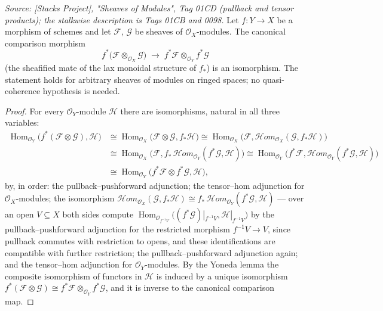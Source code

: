 \begin{lemma}\leanok
  \label{lem:pullback_tensor_map_isiso}
  \textit{Source: [Stacks Project], "Sheaves of Modules", Tag 01CD (pullback
  and tensor products); the stalkwise description is Tags 01CB and 0098.}
  Let \(f : Y \to X\) be a morphism of schemes and let \(\mathcal{F}\),
  \(\mathcal{G}\) be sheaves of \(\mathcal{O}_X\)-modules.  The canonical
  comparison morphism
  \[
    f^*\bigl(\mathcal{F} \otimes_{\mathcal{O}_X} \mathcal{G}\bigr)
    \;\longrightarrow\;
    f^*\mathcal{F} \otimes_{\mathcal{O}_Y} f^*\mathcal{G}
  \]
  (the sheafified mate of the lax monoidal structure of \(f_*\)) is an
  isomorphism.  The statement holds for arbitrary sheaves of modules on
  ringed spaces; no quasi-coherence hypothesis is needed.
\end{lemma}
\begin{proof}
  For every \(\mathcal{O}_Y\)-module \(\mathcal{H}\) there are isomorphisms,
  natural in all three variables:
  \begin{align*}
    \operatorname{Hom}_{\mathcal{O}_Y}\!\bigl(f^*(\mathcal{F} \otimes
      \mathcal{G}), \mathcal{H}\bigr)
    &\cong \operatorname{Hom}_{\mathcal{O}_X}\!\bigl(\mathcal{F} \otimes
      \mathcal{G}, f_*\mathcal{H}\bigr)
    \cong \operatorname{Hom}_{\mathcal{O}_X}\!\bigl(\mathcal{F},
      \mathcal{H}om_{\mathcal{O}_X}(\mathcal{G}, f_*\mathcal{H})\bigr) \\
    &\cong \operatorname{Hom}_{\mathcal{O}_X}\!\bigl(\mathcal{F},
      f_*\,\mathcal{H}om_{\mathcal{O}_Y}(f^*\mathcal{G}, \mathcal{H})\bigr)
    \cong \operatorname{Hom}_{\mathcal{O}_Y}\!\bigl(f^*\mathcal{F},
      \mathcal{H}om_{\mathcal{O}_Y}(f^*\mathcal{G}, \mathcal{H})\bigr) \\
    &\cong \operatorname{Hom}_{\mathcal{O}_Y}\!\bigl(f^*\mathcal{F} \otimes
      f^*\mathcal{G}, \mathcal{H}\bigr),
  \end{align*}
  by, in order: the pullback--pushforward adjunction; the tensor--hom
  adjunction for \(\mathcal{O}_X\)-modules; the isomorphism
  \(\mathcal{H}om_{\mathcal{O}_X}(\mathcal{G}, f_*\mathcal{H}) \cong
  f_*\,\mathcal{H}om_{\mathcal{O}_Y}(f^*\mathcal{G}, \mathcal{H})\) — over
  an open \(V \subseteq X\) both sides compute
  \(\operatorname{Hom}_{\mathcal{O}_{f^{-1}V}}\bigl((f^*\mathcal{G})|_{f^{-1}V},
  \mathcal{H}|_{f^{-1}V}\bigr)\) by the pullback--pushforward adjunction for
  the restricted morphism \(f^{-1}V \to V\), since pullback commutes with
  restriction to opens, and these identifications are compatible with
  further restriction; the pullback--pushforward adjunction again; and the
  tensor--hom adjunction for \(\mathcal{O}_Y\)-modules.  By the Yoneda lemma
  the composite isomorphism of functors in \(\mathcal{H}\) is induced by a
  unique isomorphism \(f^*(\mathcal{F} \otimes \mathcal{G}) \cong
  f^*\mathcal{F} \otimes_{\mathcal{O}_Y} f^*\mathcal{G}\), and it is inverse
  to the canonical comparison map.
\end{proof}

